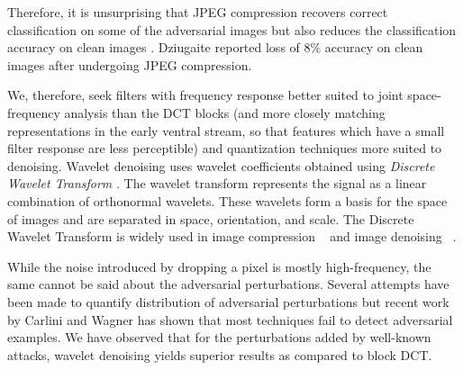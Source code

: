 Therefore, it is unsurprising that JPEG compression recovers correct classification on some of the adversarial images but  also reduces the classification accuracy on clean images \cite{Kurakin2016AdversarialEI,Das2017KeepingTB,Dziugaite2016ASO,CounteringAIGuo17}. 
Dziugaite \etal \cite{Dziugaite2016ASO} reported loss of $8$\% accuracy on clean images after undergoing JPEG compression. 

We, therefore, seek filters with frequency response better suited to joint space-frequency analysis than the DCT blocks (and more closely matching representations in the early ventral stream, so that features which have a small filter response are less perceptible) and quantization techniques more suited to denoising. %
Wavelet denoising uses wavelet coefficients obtained using \textit{Discrete Wavelet Transform} \cite{DWTantonini1992image}.
The wavelet transform represents the signal as a linear combination of orthonormal wavelets.
These wavelets form a basis for the space of images and are separated in space, orientation, and scale.
The Discrete Wavelet Transform is widely used in image compression ~\cite{JPEG2000Adams2001} and image denoising ~\cite{BayesShrinkChang2000,WaveletDenoisingRangarajan2002,Simoncelli1999BayesianDO}.

While the noise introduced by dropping a pixel is mostly high-frequency, the same cannot be said about the adversarial perturbations.
Several attempts have been made to quantify distribution of adversarial perturbations \cite{DropoutFeinman2017,ForesightLin2017DetectingAA} but recent work by Carlini and Wagner \cite{EasilyDetectedCarlini2017} has shown that most techniques fail to detect adversarial examples.
We have observed that for the perturbations added by well-known attacks, wavelet denoising yields superior results as compared to block DCT. %

